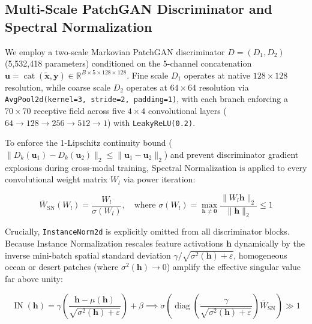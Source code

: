 \documentclass[10pt,a4paper,twoside]{article}
\begin{document}
\subsection{Multi-Scale PatchGAN Discriminator and Spectral Normalization}
We employ a two-scale Markovian PatchGAN discriminator $D = (D_1, D_2)$ (5,532,418 parameters) conditioned on the 5-channel concatenation $\mathbf{u} = \operatorname{cat}(\tilde{\mathbf{x}}, \mathbf{y}) \in \mathbb{R}^{B \times 5 \times 128 \times 128}$. Fine scale $D_1$ operates at native $128 \times 128$ resolution, while coarse scale $D_2$ operates at $64 \times 64$ resolution via \texttt{AvgPool2d(kernel=3, stride=2, padding=1)}, with each branch enforcing a $70 \times 70$ receptive field across five $4 \times 4$ convolutional layers ($64 \to 128 \to 256 \to 512 \to 1$) with \texttt{LeakyReLU(0.2)}.

To enforce the 1-Lipschitz continuity bound ($\|D_k(\mathbf{u}_1) - D_k(\mathbf{u}_2)\|_2 \le \|\mathbf{u}_1 - \mathbf{u}_2\|_2$) and prevent discriminator gradient explosions during cross-modal training, Spectral Normalization \cite{ref23} is applied to every convolutional weight matrix $W_l$ via power iteration:

\begin{equation}
    \bar{W}_{\mathrm{SN}}(W_l) = \frac{W_l}{\sigma(W_l)}, \quad \text{where } \sigma(W_l) = \max_{\mathbf{h} \neq \mathbf{0}} \frac{\|W_l \mathbf{h}\|_2}{\|\mathbf{h}\|_2} \le 1
    \label{eq:sn}
\end{equation}

Crucially, \texttt{InstanceNorm2d} is explicitly omitted from all discriminator blocks. Because Instance Normalization rescales feature activations $\mathbf{h}$ dynamically by the inverse mini-batch spatial standard deviation $\gamma / \sqrt{\sigma^2(\mathbf{h}) + \varepsilon}$, homogeneous ocean or desert patches (where $\sigma^2(\mathbf{h}) \to 0$) amplify the effective singular value far above unity:

\begin{equation}
    \operatorname{IN}(\mathbf{h}) = \gamma \left( \frac{\mathbf{h} - \mu(\mathbf{h})}{\sqrt{\sigma^2(\mathbf{h}) + \varepsilon}} \right) + \beta \implies \sigma\!\left( \operatorname{diag}\!\left(\frac{\gamma}{\sqrt{\sigma^2(\mathbf{h}) + \varepsilon}}\right) \bar{W}_{\mathrm{SN}} \right) \gg 1
    \label{eq:in_violation}
\end{equation}
\end{document}
